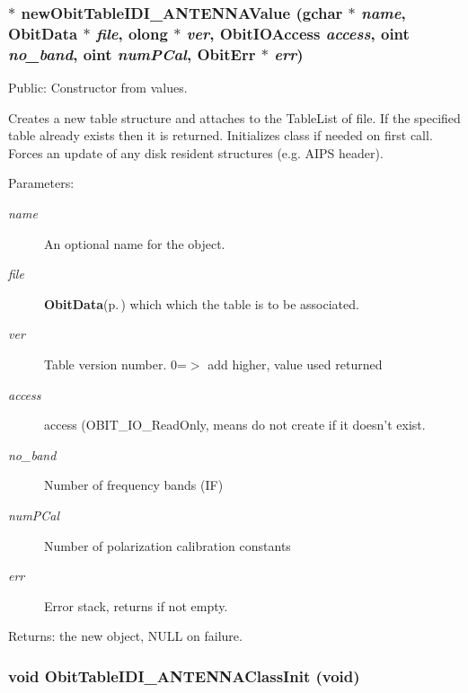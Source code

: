 \subsubsection{$\ast$ new\-Obit\-Table\-IDI\_\-ANTENNAValue (gchar $\ast$ {\em name}, {\bf Obit\-Data} $\ast$ {\em file}, {\bf olong} $\ast$ {\em ver}, Obit\-IOAccess {\em access}, {\bf oint} {\em no\_\-band}, {\bf oint} {\em num\-PCal}, {\bf Obit\-Err} $\ast$ {\em err})}\label{ObitTableIDI__ANTENNA_8c_a18}


Public: Constructor from values. 

Creates a new table structure and attaches to the Table\-List of file. If the specified table already exists then it is returned. Initializes class if needed on first call. Forces an update of any disk resident structures (e.g. AIPS header). \begin{Desc}
\item[Parameters:]
\begin{description}
\item[{\em name}]An optional name for the object. \item[{\em file}]{\bf Obit\-Data}{\rm (p.\,\pageref{structObitData})} which which the table is to be associated. \item[{\em ver}]Table version number. 0=$>$ add higher, value used returned \item[{\em access}]access (OBIT\_\-IO\_\-Read\-Only, means do not create if it doesn't exist. \item[{\em no\_\-band}]Number of frequency bands (IF) \item[{\em num\-PCal}]Number of polarization calibration constants \item[{\em err}]Error stack, returns if not empty. \end{description}
\end{Desc}
\begin{Desc}
\item[Returns:]the new object, NULL on failure. \end{Desc}
\subsubsection{\setlength{\rightskip}{0pt plus 5cm}void Obit\-Table\-IDI\_\-ANTENNAClass\-Init (void)}\label{ObitTableIDI__ANTENNA_8c_a27}



